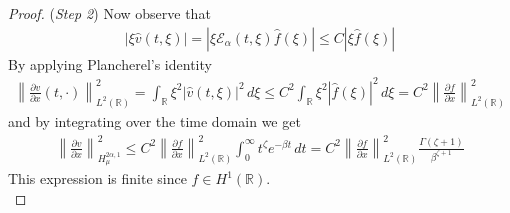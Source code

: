 \documentclass[10pt,a4paper]{amsart}
\begin{document}
\begin{proof}
({\it Step 2}) Now observe that
\begin{align*}
|\xi \hat{v}(t, \xi)| = |\xi \mathcal{E}_\alpha(t, \xi) \hat{f}(\xi)| \le C |\xi \hat{f}(\xi)|
\end{align*}
By applying Plancherel's identity 
\begin{align*}
\left\|\frac{\partial v}{\partial x}(t, \cdot)\right\|^2_{L^2(\mathbb{R})} = \int_{\mathbb{R}} \xi^2 |\hat{v}(t, \xi)|^2 \, d\xi \le C^2 \int_{\mathbb{R}} \xi^2 |\hat{f}(\xi)|^2 \, d\xi = C^2 \left\|\frac{\partial f}{\partial x}\right\|^2_{L^2(\mathbb{R})}
\end{align*}
and by integrating over the time domain we get
\begin{align*}
\left\|\frac{\partial v}{\partial x}\right\|^2_{H^{2\alpha, 1}_\mu} \le C^2 \left\|\frac{\partial f}{\partial x}\right\|^2_{L^2(\mathbb{R})} \int_0^\infty t^\zeta e^{-\beta t} \, dt = C^2 \left\|\frac{\partial f}{\partial x}\right\|^2_{L^2(\mathbb{R})} \frac{\Gamma(\zeta + 1)}{\beta^{\zeta + 1}}
\end{align*}
This expression is finite since $f \in H^1(\mathbb{R})$.\\


\end{proof}
\end{document}
